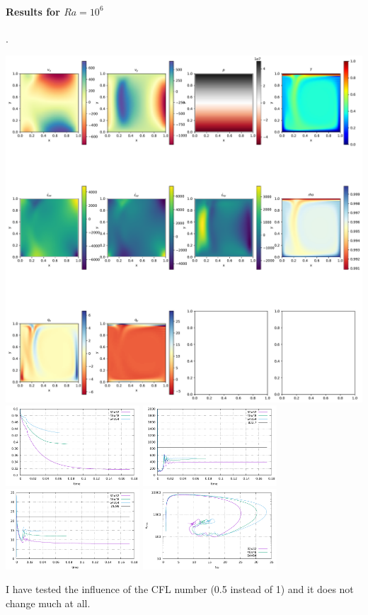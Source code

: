 \newpage
\paragraph{Results for $Ra=10^6$}.
\begin{center}
\includegraphics[width=16cm]{python_codes/fieldstone_03/results_1e6/48x48/solution.pdf}\\
\includegraphics[width=5cm]{python_codes/fieldstone_03/results_1e6/Tavrg.pdf}
\includegraphics[width=5cm]{python_codes/fieldstone_03/results_1e6/vrms.pdf}\\
\includegraphics[width=5cm]{python_codes/fieldstone_03/results_1e6/Nu.pdf}
\includegraphics[width=5cm]{python_codes/fieldstone_03/results_1e6/Nu_vrms.pdf}
\end{center}


I have tested the influence of the CFL number (0.5 instead of 1) and it does not change much at all.





